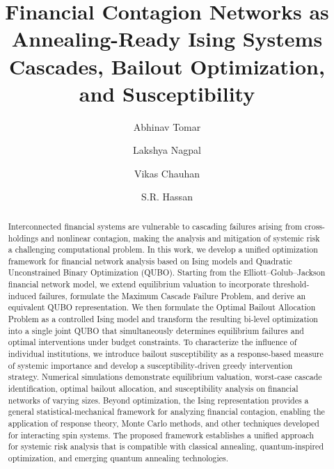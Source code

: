 \documentclass[aps,reprint,superscriptaddress,pra]{revtex4-2}
\begin{document}
\title{\textbf{Financial Contagion Networks as Annealing-Ready Ising Systems}\\[0.3em]
\large Cascades, Bailout Optimization, and Susceptibility}


\author{Abhinav Tomar}
\author{Lakshya Nagpal}
\author{Vikas Chauhan}
\author{S.R. Hassan}



\begin{abstract}
Interconnected financial systems are vulnerable to cascading failures arising from cross-holdings and nonlinear contagion, making the analysis and mitigation of systemic risk a challenging computational problem. In this work, we develop a unified optimization framework for financial network analysis based on Ising models and Quadratic Unconstrained Binary Optimization (QUBO). Starting from the Elliott--Golub--Jackson financial network model, we extend equilibrium valuation to incorporate threshold-induced failures, formulate the Maximum Cascade Failure Problem, and derive an equivalent QUBO representation. We then formulate the Optimal Bailout Allocation Problem as a controlled Ising model and transform the resulting bi-level optimization into a single joint QUBO that simultaneously determines equilibrium failures and optimal interventions under budget constraints. To characterize the influence of individual institutions, we introduce bailout susceptibility as a response-based measure of systemic importance and develop a susceptibility-driven greedy intervention strategy. Numerical simulations demonstrate equilibrium valuation, worst-case cascade identification, optimal bailout allocation, and susceptibility analysis on financial networks of varying sizes. 
Beyond optimization, the Ising representation provides a general statistical-mechanical framework for analyzing financial contagion, enabling the application of response theory, Monte Carlo methods, and other techniques developed for interacting spin systems.
The proposed framework establishes a unified approach for systemic risk analysis that is compatible with classical annealing, quantum-inspired optimization, and emerging quantum annealing technologies.
\end{abstract}
\end{document}
